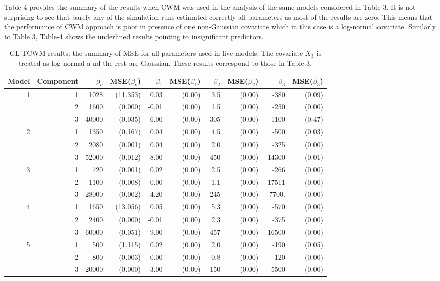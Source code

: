 \documentclass[11pt,letterpaper]{article}
\numberwithin{equation}{section}
\numberwithin{equation}{section}
\numberwithin{equation}{section}
\begin{document}
Table 4 provides the summary of the results when CWM was used in the analysis of the same models considered in Table 3. It is not surprising to see that barely any of the simulation runs estimated correctly all parameters as most of the results are zero. This means that the performance of CWM approach is poor in presence of one non-Gaussian covariate which in this case is a log-normal covariate. Similarly to Table 3, Table-4 shows the underlined results pointing to insignificant predictors.

\begin{table}[!htb]
\centering
\caption{ GL-TCWM results: the summary of MSE for all parameters used in five models. The covariate $X_3$ is treated as log-normal a nd the rest are Gaussian. These results correspond to those in Table 3.}
\label{my-label}
\begin{tabular}{rrrrrrrrrr}
\hline\hline
Model & Component & $\beta_o$ &  MSE($\beta_o$)   &  $\beta_1$ & MSE($\beta_1$)& $\beta_2$ &MSE($\beta_2$)   & $\beta_3$ &  MSE($\beta_3$)  \\
\hline
1     & 1         & 1028& (11.353)   & 0.03& (0.00)  & 3.5& (0.00)    & -380& (0.09)   \\
      & 2         & 1600& (0.000)     & -0.01&(0.00) & 1.5&(0.00)    & -250&(0.00)   \\
      & 3         & 40000&(0.035)    & -6.00&(0.00) & -305&(0.00) & 1100&(0.47)   \\
2     & 1         & 1350&(0.167)     & 0.04&(0.00)  & 4.5&(0.00)    & -500&(0.03)   \\
      & 2         & 2080& (0.001)     & 0.04&(0.00)  & 2.0&(0.00)    & -325&(0.00)   \\
      & 3         & 52000& (0.012)    & -8.00&(0.00) & 450&(0.00)  & 14300&(0.01)  \\
3     & 1         & 720& (0.001)      & 0.02&(0.00)  & 2.5&(0.00)   & -266&(0.00)   \\
      & 2         & 1100& (0.008)     & 0.00&(0.00)  & 1.1&(0.00)    & -17511&(0.00) \\
      & 3         & 28000& (0.002)    & -4.20&(0.00) & 245&(0.00)  & 7700.&(0.00) \\
4     & 1         & 1650&(13.056)   & 0.05&(0.00)  & 5.3&(0.00)    & -570&(0.00)   \\
      & 2         & 2400& (0.000)     & -0.01&(0.00) & 2.3&(0.00)    & -375&(0.00)   \\
      & 3         & 60000& (0.051)    & -9.00&(0.00) & -457&(0.00) & 16500&(0.00)  \\
5     & 1         & 500& (1.115)     & 0.02&(0.00)  & 2.0&(0.00)    & -190&(0.05)   \\
      & 2         & 800& (0.003)      & 0.00&(0.00)  & 0.8&(0.00)    & -120&(0.00)   \\
      & 3         & 20000& (0.000)    & -3.00&(0.00) & -150&(0.00) & 5500&(0.00)  \\
      \hline\hline
\end{tabular}

\end{table}
\end{document}
